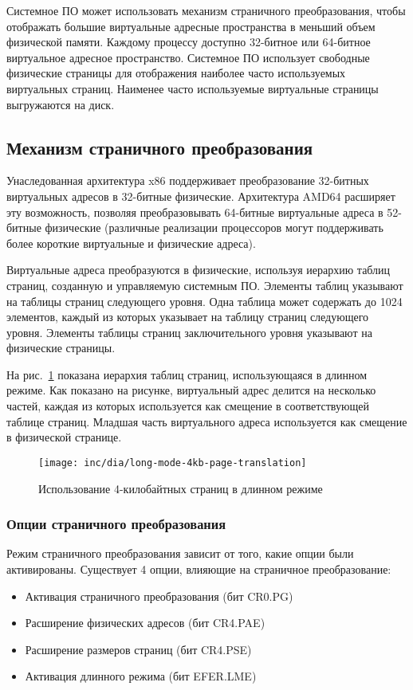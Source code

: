 Системное ПО может использовать механизм страничного преобразования, чтобы отображать большие
виртуальные адресные пространства в меньший объем физической памяти. Каждому процессу доступно
32-битное или 64-битное виртуальное адресное пространство. Системное ПО использует свободные
физические страницы для отображения наиболее часто используемых виртуальных страниц. Наименее часто
используемые виртуальные страницы выгружаются на диск.

\subsection{Механизм страничного преобразования}
Унаследованная архитектура x86 поддерживает преобразование 32-битных виртуальных адресов в 32-битные физические.
Архитектура AMD64 расширяет эту возможность, позволяя преобразовывать 64-битные виртуальные адреса в 52-битные
физические (различные реализации процессоров могут поддерживать более короткие виртуальные и физические адреса).

Виртуальные адреса преобразуются в физические, используя иерархию таблиц страниц, созданную и управляемую системным ПО.
Элементы таблиц указывают на таблицы страниц следующего уровня. Одна таблица может содержать до 1024 элементов,
каждый из которых указывает на таблицу страниц следующего уровня. Элементы таблицы страниц заключительного уровня
указывают на физические страницы.

На рис.~\ref{fig:long-mode-4kb-page-translation} показана иерархия таблиц страниц, использующаяся в длинном режиме.
Как показано на рисунке, виртуальный адрес делится на несколько частей, каждая из которых используется как смещение
в соответствующей таблице страниц. Младшая часть виртуального адреса используется как смещение в физической странице.

\begin{figure}[ht!]
  \centering
  \texttt{[image: inc/dia/long-mode-4kb-page-translation]}
  \caption{Использование 4-килобайтных страниц в длинном режиме}
  \label{fig:long-mode-4kb-page-translation}
\end{figure}

\subsubsection*{Опции страничного преобразования}
Режим страничного преобразования зависит от того, какие опции были активированы. Существует
4 опции, влияющие на страничное преобразование:
\begin{itemize}
	\item Активация страничного преобразования (бит CR0.PG)
	\item Расширение физических адресов (бит CR4.PAE)
	\item Расширение размеров страниц (бит CR4.PSE)
	\item Активация длинного режима (бит EFER.LME)
\end{itemize}

